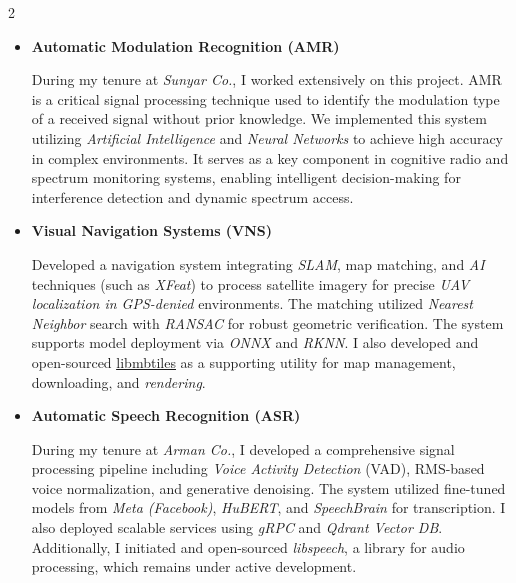 \documentclass[a4paper,11pt]{article}
\newcommand{\resumeHeadingListStart}{
\begin{itemize}[leftmargin=0.15in, label={}]
}
\newcommand{\resumeHeadingListEnd}{\end{itemize}}
\begin{document}
\begin{multicols}{2}
	\resumeHeadingListStart{}

	
\item \begin{minipage}{\linewidth}
	\faBroadcastTower\hspace{3pt}\textbf{Automatic Modulation Recognition (AMR)} 
	
	\vspace{4pt} \small
    During my tenure at \textit{Sunyar Co.}, I worked extensively on this project. AMR is a critical signal processing technique used to identify the modulation type of a received signal without prior knowledge. We implemented this system utilizing \textit{Artificial Intelligence} and \textit{Neural Networks} to achieve high accuracy in complex environments. It serves as a key component in cognitive radio and spectrum monitoring systems, enabling intelligent decision-making for interference detection and dynamic spectrum access.

\end{minipage}


\item \begin{minipage}{\linewidth}
	\faBroadcastTower\hspace{3pt}\textbf{Visual Navigation Systems (VNS)}
	
	\vspace{4pt} \small
        Developed a navigation system integrating \textit{SLAM}, map matching, and \textit{AI} techniques (such as \textit{XFeat}) to process satellite imagery for precise \textit{UAV localization in GPS-denied} environments.
         The matching utilized \textit{Nearest Neighbor} search with \textit{RANSAC} for robust geometric verification.
         The system supports model deployment via \textit{ONNX} and \textit{RKNN}. I also developed and open-sourced \href{https://github.com/mohammadraziei/libmbtiles}{\uline{libmbtiles}} as a supporting utility for map management, downloading, and \textit{rendering}.
\end{minipage}


\item \begin{minipage}{\linewidth}
	\faBroadcastTower\hspace{3pt}\textbf{Automatic Speech Recognition (ASR)}
	
	\vspace{4pt} \small
	During my tenure at \textit{Arman Co.}, I developed a comprehensive signal processing pipeline including \textit{Voice Activity Detection} (VAD), RMS-based voice normalization, and generative denoising. The system utilized fine-tuned models from \textit{Meta (Facebook)}, \textit{HuBERT}, and \textit{SpeechBrain} for transcription. I also deployed scalable services using \textit{gRPC} and \textit{Qdrant Vector DB}. Additionally, I initiated and open-sourced \textit{libspeech}, a library for audio processing, which remains under active development.
\end{minipage}


\resumeHeadingListEnd{}
\end{multicols}
\end{document}
